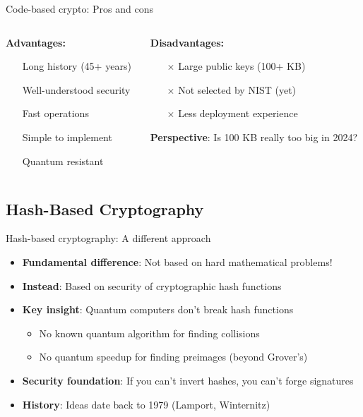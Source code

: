 \documentclass[aspectratio=169, lualatex, handout]{beamer}
\begin{document}
\begin{frame}{Code-based crypto: Pros and cons}
	\begin{columns}[c]
		\begin{column}{0.5\textwidth}
			\textbf{Advantages:}
			\begin{itemize}
				\item[\mycheckmark] Long history (45+ years)
				\item[\mycheckmark] Well-understood security
				\item[\mycheckmark] Fast operations
				\item[\mycheckmark] Simple to implement
				\item[\mycheckmark] Quantum resistant
			\end{itemize}
		\end{column}
		\begin{column}{0.5\textwidth}
			\textbf{Disadvantages:}
			\begin{itemize}
				\item[$\times$] Large public keys (100+ KB)
				\item[$\times$] Not selected by NIST (yet)
				\item[$\times$] Less deployment experience
			\end{itemize}

			\vspace{5mm}
			\textbf{Perspective}: Is 100 KB really too big in 2024?
		\end{column}
	\end{columns}
\end{frame}

\subsection{Hash-Based Cryptography}

\begin{frame}{Hash-based cryptography: A different approach}
	\begin{itemize}
		\item \textbf{Fundamental difference}: Not based on hard mathematical problems!
		\item \textbf{Instead}: Based on security of cryptographic hash functions
		\item \textbf{Key insight}: Quantum computers don't break hash functions
		      \begin{itemize}
			      \item No known quantum algorithm for finding collisions
			      \item No quantum speedup for finding preimages (beyond Grover's)
		      \end{itemize}
		\item \textbf{Security foundation}: If you can't invert hashes, you can't forge signatures
		\item \textbf{History}: Ideas date back to 1979 (Lamport, Winternitz)
	\end{itemize}
\end{frame}
\end{document}
